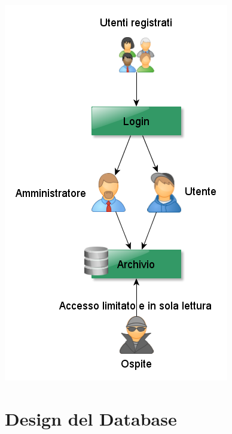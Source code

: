 \documentclass[a4paper,12pt]{article}
\begin{document}
\clearpage

\begin{center}
\includegraphics[scale=0.75]{sottosistemi.png}
\end{center}

\clearpage

\section{Design del Database}
\end{document}
